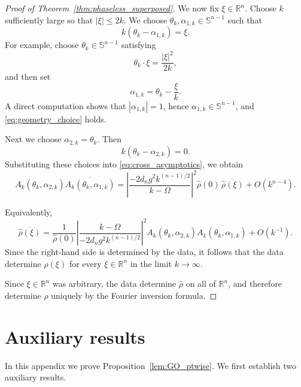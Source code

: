 \documentclass[12pt,a4paper]{amsart}
\numberwithin{equation}{section}
\theoremstyle{plain}
\theoremstyle{definition}
\begin{document}
\begin{proof}[Proof of Theorem~\ref{thm:phaseless_superposed}]
We now fix \(\xi\in\mathbb{R}^n\). Choose \(k\) sufficiently large so that
\(|\xi|\le 2k\). We choose \(\theta_k,\alpha_{1,k}\in\mathbb{S}^{n-1}\) such that
\begin{equation}\label{eq:geometry_choice}
    k(\theta_k-\alpha_{1,k})=\xi.
\end{equation}
For example, choose \(\theta_k\in\mathbb{S}^{n-1}\) satisfying
\begin{equation*}
    \theta_k\cdot\xi = \frac{|\xi|^2}{2k},
\end{equation*}
and then set
\begin{equation*}
    \alpha_{1,k} = \theta_k-\frac{\xi}{k}.
\end{equation*}
A direct computation shows that \(|\alpha_{1,k}|=1\), hence
\(\alpha_{1,k}\in\mathbb{S}^{n-1}\), and \eqref{eq:geometry_choice} holds.

Next we choose $\alpha_{2,k}=\theta_k$. Then
\begin{equation*}
    k(\theta_k-\alpha_{2,k})=0.
\end{equation*}
Substituting these choices into \eqref{eq:cross_asymptotics}, we obtain
\begin{equation*}
    A_k(\theta_k,\alpha_{2,k})\overline{A_k(\theta_k,\alpha_{1,k})}
    =
    \left|\frac{-2d_n g^2 k^{(n-1)/2}}{k-\Omega}\right|^2
    \widehat{\rho}(0)\,\overline{\widehat{\rho}(\xi)}
    +
    O\left(k^{n-4}\right).
\end{equation*}

Equivalently,
\begin{equation*}
    \overline{\widehat{\rho}(\xi)}
    =
    \frac{1}{\widehat{\rho}(0)}
    \left|\frac{k-\Omega}{-2d_n g^2 k^{(n-1)/2}}\right|^2
    A_k(\theta_k,\alpha_{2,k})\overline{A_k(\theta_k,\alpha_{1,k})}
    +
    O(k^{-1}).
\end{equation*}
Since the right-hand side is determined by the data,
it follows that the data determine \(\widehat{\rho}(\xi)\) for every
\(\xi\in\mathbb{R}^n\) in the limit \(k\to\infty\).

Since $\xi\in\mathbb{R}^n$ was arbitrary, the data determine
$\widehat{\rho}$ on all of $\mathbb{R}^n$, and therefore determine
$\rho$ uniquely by the Fourier inversion formula.
\end{proof}


\appendix
\section{Auxiliary results}\label{sec:appendix}
In this appendix we prove Proposition~\ref{lem:GO_ptwise}.
We first establish two auxiliary results.
\end{document}
